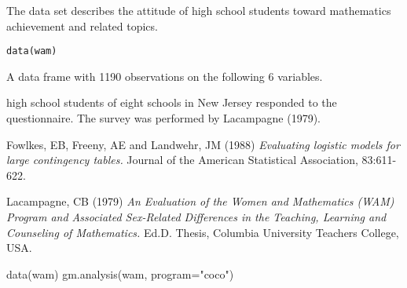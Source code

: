 \begin{Description}\relax
The data set describes the attitude of high school students toward
mathematics achievement and related topics.
\end{Description}
\begin{Usage}
\begin{verbatim}data(wam)\end{verbatim}
\end{Usage}
\begin{Format}\relax
A data frame with 1190 observations on the following 6 variables.
\end{Format}
\begin{Details} high school students of eight schools in New Jersey responded to 
the questionnaire. The survey was performed by Lacampagne (1979).
\end{Details}
\begin{Source}\relax
Fowlkes, EB, Freeny, AE and Landwehr, JM (1988) \emph{Evaluating logistic models for large contingency tables.}
Journal of the American Statistical Association, 83:611-622.
\end{Source}
\begin{References}\relax
Lacampagne, CB (1979) \emph{An Evaluation of the Women and Mathematics (WAM) Program and Associated Sex-Related Differences in the Teaching, 
Learning and Counseling of Mathematics.}
Ed.D. Thesis, Columbia University Teachers College, USA.
\end{References}
\begin{Examples}
\begin{ExampleCode}
  data(wam)
  gm.analysis(wam, program="coco")
\end{ExampleCode}
\end{Examples}

